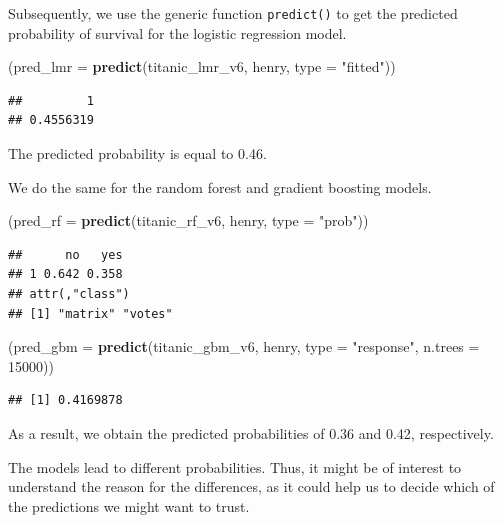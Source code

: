 \documentclass[12pt,]{krantz}
\newenvironment{Shaded}{\begin{snugshade}}{\end{snugshade}}
\newcommand{\DataTypeTok}[1]{\textcolor[rgb]{0.13,0.29,0.53}{#1}}
\newcommand{\DecValTok}[1]{\textcolor[rgb]{0.00,0.00,0.81}{#1}}
\newcommand{\KeywordTok}[1]{\textcolor[rgb]{0.13,0.29,0.53}{\textbf{#1}}}
\newcommand{\NormalTok}[1]{#1}
\newcommand{\StringTok}[1]{\textcolor[rgb]{0.31,0.60,0.02}{#1}}
\theoremstyle{definition}
\theoremstyle{definition}
\theoremstyle{definition}
\theoremstyle{remark}
\begin{document}
Subsequently, we use the generic function \texttt{predict()} to get the
predicted probability of survival for the logistic regression model.

\begin{Shaded}
\begin{Highlighting}[]
\NormalTok{(}\DataTypeTok{pred_lmr =} \KeywordTok{predict}\NormalTok{(titanic_lmr_v6, henry, }\DataTypeTok{type =} \StringTok{"fitted"}\NormalTok{))}
\end{Highlighting}
\end{Shaded}

\begin{verbatim}
##         1 
## 0.4556319
\end{verbatim}

The predicted probability is equal to 0.46.

We do the same for the random forest and gradient boosting models.

\begin{Shaded}
\begin{Highlighting}[]
\NormalTok{(}\DataTypeTok{pred_rf =} \KeywordTok{predict}\NormalTok{(titanic_rf_v6, henry, }\DataTypeTok{type =} \StringTok{"prob"}\NormalTok{))}
\end{Highlighting}
\end{Shaded}

\begin{verbatim}
##      no   yes
## 1 0.642 0.358
## attr(,"class")
## [1] "matrix" "votes"
\end{verbatim}

\begin{Shaded}
\begin{Highlighting}[]
\NormalTok{(}\DataTypeTok{pred_gbm =} \KeywordTok{predict}\NormalTok{(titanic_gbm_v6, henry, }\DataTypeTok{type =} \StringTok{"response"}\NormalTok{, }\DataTypeTok{n.trees =} \DecValTok{15000}\NormalTok{))}
\end{Highlighting}
\end{Shaded}

\begin{verbatim}
## [1] 0.4169878
\end{verbatim}

As a result, we obtain the predicted probabilities of 0.36 and 0.42,
respectively.

The models lead to different probabilities. Thus, it might be of
interest to understand the reason for the differences, as it could help
us to decide which of the predictions we might want to trust.
\end{document}
